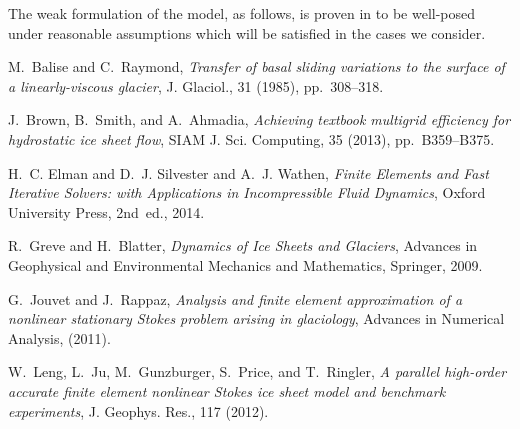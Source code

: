 \documentclass[letterpaper,final,12pt,reqno]{amsart}
\begin{document}
The weak formulation of the model, as follows, is proven in \cite{JouvetRappaz2011} to be well-posed under reasonable assumptions which will be satisfied in the cases we consider.




\footnotesize

\bigskip

\begin{thebibliography}{6}

{\sc M.~Balise and C.~Raymond}, {\em Transfer of basal sliding variations to
  the surface of a linearly-viscous glacier}, J. Glaciol., 31 (1985),
  pp.~308--318.

{\sc J.~Brown, B.~Smith, and A.~Ahmadia}, {\em Achieving textbook multigrid
  efficiency for hydrostatic ice sheet flow}, SIAM J. Sci. Computing,
  35 (2013), pp.~B359--B375.

{\sc H.~C. Elman and D.~J. Silvester and A.~J. Wathen}, {\em Finite Elements
  and Fast Iterative Solvers: with Applications in Incompressible Fluid Dynamics},
  Oxford University Press, 2nd~ed., 2014.

{\sc R.~Greve and H.~Blatter}, {\em Dynamics of {I}ce {S}heets and {G}laciers},
  Advances in Geophysical and Environmental Mechanics and Mathematics,
  Springer, 2009.

{\sc G.~Jouvet and J.~Rappaz}, {\em Analysis and finite element approximation
  of a nonlinear stationary {S}tokes problem arising in glaciology}, Advances
  in Numerical Analysis, (2011).

{\sc W.~Leng, L.~Ju, M.~Gunzburger, S.~Price, and T.~Ringler}, {\em A parallel
  high-order accurate finite element nonlinear {S}tokes ice sheet model and
  benchmark experiments}, J. Geophys. Res., 117 (2012).

\end{thebibliography}
\end{document}
